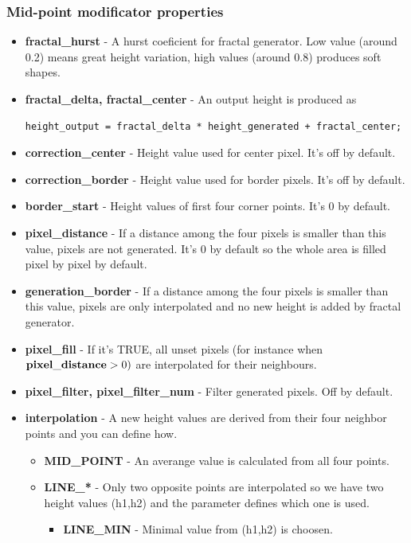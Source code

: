 \documentclass[9pt]{article}
\begin{document}
\subsubsection*{Mid-point modificator properties}
\begin{itemize}
\item{\bf fractal\_hurst} - A hurst coeficient for fractal generator. Low value 
(around 0.2) means great height variation, high values (around 0.8) produces soft shapes.
\item{\bf fractal\_delta, fractal\_center} - An output height is produced as
\begin{verbatim}
height_output = fractal_delta * height_generated + fractal_center;
\end{verbatim}
\item{\bf correction\_center} - Height value used for center pixel. It's off by default.
\item{\bf correction\_border} - Height value used for border pixels. It's off by default.
\item{\bf border\_start} - Height values of first four corner points. It's 0 by default.
\item{\bf pixel\_distance} - If a distance among the four pixels is smaller than this value,
pixels are not generated. It's 0 by default so the whole area is filled pixel by pixel by default.
\item{\bf generation\_border} - If a distance among the four pixels is smaller than this value,
pixels are only interpolated and no new height is added by fractal generator.
\item{\bf pixel\_fill} - If it's TRUE, all unset pixels (for instance when 
\begin{math}{\bf pixel\_distance} > 0)\end{math} are interpolated for their neighbours.
\item{\bf pixel\_filter, pixel\_filter\_num} - Filter generated pixels. Off by default.
\item{\bf interpolation} - A new height values are derived
from their four neighbor points and you can define how.
\begin{itemize}
\item{\bf MID\_POINT} - An averange value is calculated from all four points.
\item{\bf LINE\_*} - Only two opposite points are interpolated so we have two 
height values (h1,h2) and the parameter defines which one is used.
\begin{itemize}
\item{\bf LINE\_MIN} - Minimal value from (h1,h2) is choosen.

\end{itemize}
\end{itemize}
\end{itemize}
\end{document}
